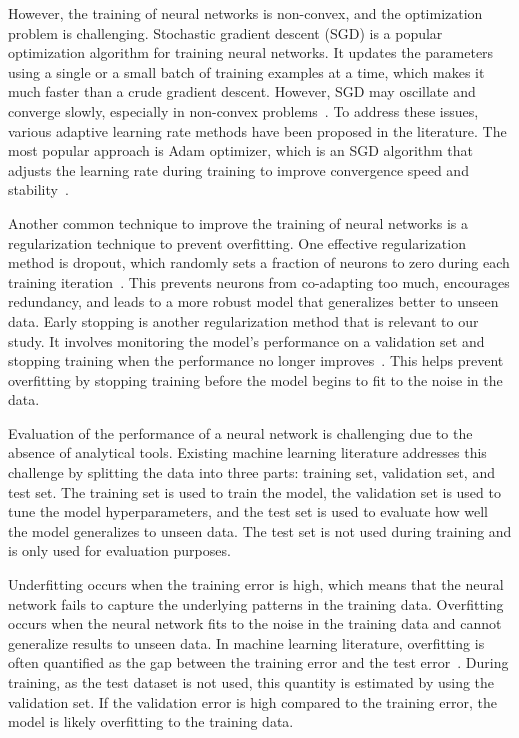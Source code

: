 However, the training of neural networks is non-convex, and the optimization problem is challenging.
Stochastic gradient descent (SGD) is a popular optimization algorithm for training neural networks.
It updates the parameters using a single or a small batch of training examples at a time, which makes it much faster than a crude gradient descent.
However, SGD may oscillate and converge slowly, especially in non-convex problems~\citep{bengio2016}.
To address these issues, various adaptive learning rate methods have been proposed in the literature.
The most popular approach is Adam optimizer, which is an SGD algorithm that adjusts the learning rate during training to improve convergence speed and stability~\citep{kingma2014adam}.

Another common technique to improve the training of neural networks is a regularization technique to prevent overfitting.
One effective regularization method is dropout, which randomly sets a fraction of neurons to zero during each training iteration~\citep{srivastava2014dropout}.
This prevents neurons from co-adapting too much, encourages redundancy, and leads to a more robust model that generalizes better to unseen data.
Early stopping is another regularization method that is relevant to our study.
It involves monitoring the model's performance on a validation set and stopping training when the performance no longer improves~\citep{prechelt2002early}.
This helps prevent overfitting by stopping training before the model begins to fit to the noise in the data.

Evaluation of the performance of a neural network is challenging due to the absence of analytical tools.
Existing machine learning literature addresses this challenge by splitting the data into three parts: training set, validation set, and test set.
The training set is used to train the model, the validation set is used to tune the model hyperparameters, and the test set is used to evaluate how well the model generalizes to unseen data.
The test set is not used during training and is only used for evaluation purposes.

Underfitting occurs when the training error is high, which means that the neural network fails to capture the underlying patterns in the training data.
Overfitting occurs when the neural network fits to the noise in the training data and cannot generalize results to unseen data.
In machine learning literature, overfitting is often quantified as the gap between the training error and the test error~\citep{bishop2006pattern}.
During training, as the test dataset is not used, this quantity is estimated by using the validation set.
If the validation error is high compared to the training error, the model is likely overfitting to the training data.

